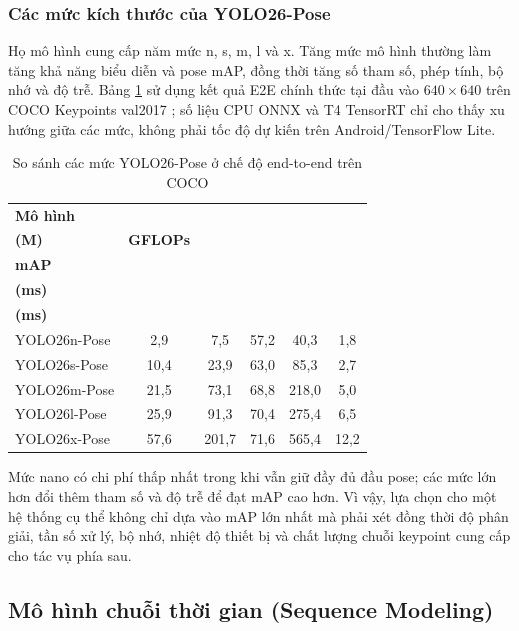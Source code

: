 \subsubsection{Các mức kích thước của YOLO26-Pose}
\label{sec:yolo26_pose_scales}

Họ mô hình cung cấp năm mức n, s, m, l và x. Tăng mức mô hình thường làm tăng khả năng biểu diễn và pose mAP, đồng thời tăng số tham số, phép tính, bộ nhớ và độ trễ. Bảng \ref{tab:yolo26_pose_scales} sử dụng kết quả E2E chính thức tại đầu vào $640\times640$ trên COCO Keypoints val2017 ; số liệu CPU ONNX và T4 TensorRT chỉ cho thấy xu hướng giữa các mức, không phải tốc độ dự kiến trên Android/TensorFlow Lite.

\begin{table}[htbp]
\centering
\caption{So sánh các mức YOLO26-Pose ở chế độ end-to-end trên COCO}
\label{tab:yolo26_pose_scales}
\renewcommand{\arraystretch}{1.1}
\small
\begin{tabularx}{\textwidth}{|>{\raggedright\arraybackslash}X|c|c|c|c|c|}
\hline
\textbf{Mô hình} & \shortstack{\textbf{Tham số}\\\textbf{(M)}} & \textbf{GFLOPs} & \shortstack{\textbf{Pose}\\\textbf{mAP}} & \shortstack{\textbf{CPU ONNX}\\\textbf{(ms)}} & \shortstack{\textbf{T4 TRT}\\\textbf{(ms)}} \\
\hline
YOLO26n-Pose & 2,9 & 7,5 & 57,2 & 40,3 & 1,8 \\
YOLO26s-Pose & 10,4 & 23,9 & 63,0 & 85,3 & 2,7 \\
YOLO26m-Pose & 21,5 & 73,1 & 68,8 & 218,0 & 5,0 \\
YOLO26l-Pose & 25,9 & 91,3 & 70,4 & 275,4 & 6,5 \\
YOLO26x-Pose & 57,6 & 201,7 & 71,6 & 565,4 & 12,2 \\
\hline
\end{tabularx}
\end{table}

Mức nano có chi phí thấp nhất trong khi vẫn giữ đầy đủ đầu pose; các mức lớn hơn đổi thêm tham số và độ trễ để đạt mAP cao hơn. Vì vậy, lựa chọn cho một hệ thống cụ thể không chỉ dựa vào mAP lớn nhất mà phải xét đồng thời độ phân giải, tần số xử lý, bộ nhớ, nhiệt độ thiết bị và chất lượng chuỗi keypoint cung cấp cho tác vụ phía sau.

\subsection{Mô hình chuỗi thời gian (Sequence Modeling)}

